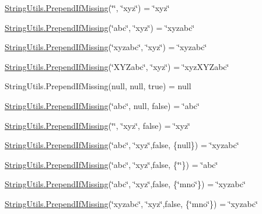 \hyperlink{class_ultimate_1_1_utilities_1_1_string_utils_a1ed699a1e32e6ab6103afccb02ade8c7}{String\+Utils.\+Prepend\+If\+Missing}(\char`\"{}\char`\"{}, \char`\"{}xyz\char`\"{}) = \char`\"{}xyz\char`\"{} 

\hyperlink{class_ultimate_1_1_utilities_1_1_string_utils_a1ed699a1e32e6ab6103afccb02ade8c7}{String\+Utils.\+Prepend\+If\+Missing}(\char`\"{}abc\char`\"{}, \char`\"{}xyz\char`\"{}) = \char`\"{}xyzabc\char`\"{} 

\hyperlink{class_ultimate_1_1_utilities_1_1_string_utils_a1ed699a1e32e6ab6103afccb02ade8c7}{String\+Utils.\+Prepend\+If\+Missing}(\char`\"{}xyzabc\char`\"{}, \char`\"{}xyz\char`\"{}) = \char`\"{}xyzabc\char`\"{} 

\hyperlink{class_ultimate_1_1_utilities_1_1_string_utils_a1ed699a1e32e6ab6103afccb02ade8c7}{String\+Utils.\+Prepend\+If\+Missing}(\char`\"{}\+X\+Y\+Zabc\char`\"{}, \char`\"{}xyz\char`\"{}) = \char`\"{}xyz\+X\+Y\+Zabc\char`\"{} 

String\+Utils.\+Prepend\+If\+Missing(null, null, true) = null 

\hyperlink{class_ultimate_1_1_utilities_1_1_string_utils_a1ed699a1e32e6ab6103afccb02ade8c7}{String\+Utils.\+Prepend\+If\+Missing}(\char`\"{}abc\char`\"{}, null, false) = \char`\"{}abc\char`\"{} 

\hyperlink{class_ultimate_1_1_utilities_1_1_string_utils_a1ed699a1e32e6ab6103afccb02ade8c7}{String\+Utils.\+Prepend\+If\+Missing}(\char`\"{}\char`\"{}, \char`\"{}xyz\char`\"{}, false) = \char`\"{}xyz\char`\"{} 

\hyperlink{class_ultimate_1_1_utilities_1_1_string_utils_a1ed699a1e32e6ab6103afccb02ade8c7}{String\+Utils.\+Prepend\+If\+Missing}(\char`\"{}abc\char`\"{}, \char`\"{}xyz\char`\"{},false, \{null\}) = \char`\"{}xyzabc\char`\"{} 

\hyperlink{class_ultimate_1_1_utilities_1_1_string_utils_a1ed699a1e32e6ab6103afccb02ade8c7}{String\+Utils.\+Prepend\+If\+Missing}(\char`\"{}abc\char`\"{}, \char`\"{}xyz\char`\"{},false, \{\char`\"{}\char`\"{}\}) = \char`\"{}abc\char`\"{} 

\hyperlink{class_ultimate_1_1_utilities_1_1_string_utils_a1ed699a1e32e6ab6103afccb02ade8c7}{String\+Utils.\+Prepend\+If\+Missing}(\char`\"{}abc\char`\"{}, \char`\"{}xyz\char`\"{},false, \{\char`\"{}mno\char`\"{}\}) = \char`\"{}xyzabc\char`\"{} 

\hyperlink{class_ultimate_1_1_utilities_1_1_string_utils_a1ed699a1e32e6ab6103afccb02ade8c7}{String\+Utils.\+Prepend\+If\+Missing}(\char`\"{}xyzabc\char`\"{}, \char`\"{}xyz\char`\"{},false, \{\char`\"{}mno\char`\"{}\}) = \char`\"{}xyzabc\char`\"{} 

